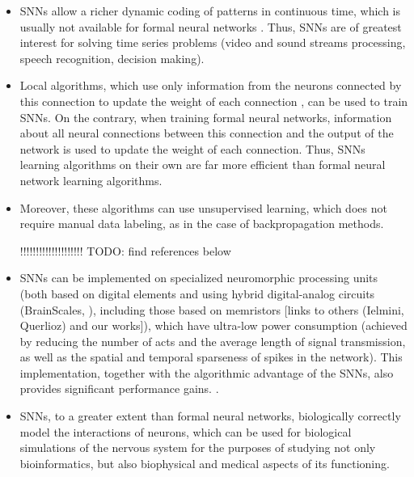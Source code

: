 \documentclass[a4paper]{article}
\begin{document}
\begin{itemize}
\item SNNs allow a richer dynamic coding of patterns in continuous time, which is usually not available for formal neural networks \cite{Ismail_Fawaz_2019}. Thus, SNNs are of greatest interest for solving time series problems (video and sound streams processing, speech recognition, decision making).

\item Local algorithms, which use only information from the neurons connected by this connection to update the weight of each connection \cite{STDP, pehlevan2019spiking, Baldi_2016}, can be used to train SNNs. On the contrary, when training formal neural networks, information about all neural connections between this connection and the output of the network is used to update the weight of each connection. Thus, SNNs learning algorithms on their own are far more efficient than formal neural network learning algorithms.

\item Moreover, these algorithms can use unsupervised learning, which does not require manual data labeling, as in the case of backpropagation methods.

!!!!!!!!!!!!!!!!!!!! TODO: find references below

\item SNNs can be implemented on specialized neuromorphic processing units (both based on digital elements \cite{TrueNorth, Loihi, Akida} and using hybrid digital-analog circuits (BrainScales, \cite{SpiNNaker}), including those based on memristors [links to others (Ielmini, Querlioz) and our works]), which have ultra-low power consumption (achieved by reducing the number of acts and the average length of signal transmission, as well as the spatial and temporal sparseness of spikes in the network). This implementation, together with the algorithmic advantage of the SNNs, also provides significant performance gains. \cite{hardware1, hardware2}.

\item SNNs, to a greater extent than formal neural networks, biologically correctly model the interactions of neurons, which can be used for biological simulations of the nervous system for the purposes of studying not only bioinformatics, but also biophysical and medical aspects of its functioning.
\end{itemize}
\end{document}
